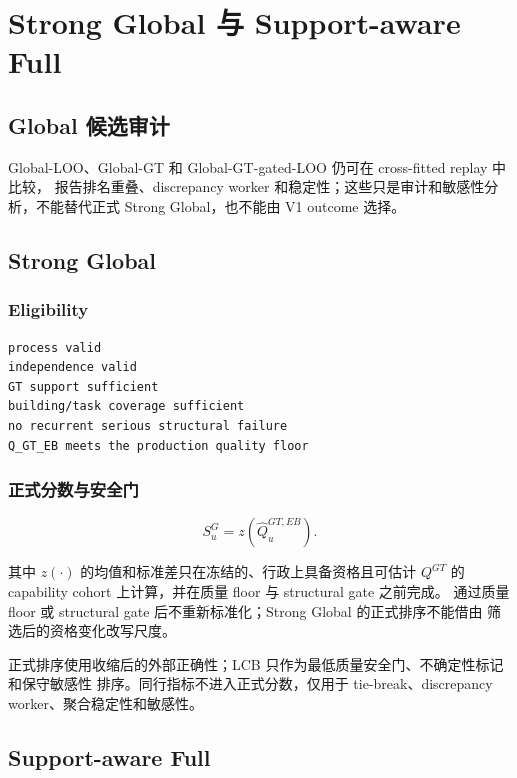 \section{Strong Global 与 Support-aware Full}

\subsection{Global 候选审计}

Global-LOO、Global-GT 和 Global-GT-gated-LOO 仍可在 cross-fitted replay 中比较，
报告排名重叠、discrepancy worker 和稳定性；这些只是审计和敏感性分析，不能替代正式
Strong Global，也不能由 V1 outcome 选择。

\subsection{Strong Global}

\subsubsection{Eligibility}

\begin{verbatim}
process valid
independence valid
GT support sufficient
building/task coverage sufficient
no recurrent serious structural failure
Q_GT_EB meets the production quality floor
\end{verbatim}

\subsubsection{正式分数与安全门}

\[
S^G_u=z\!\left(\widehat Q^{GT,EB}_u\right).
\]

其中 \(z(\cdot)\) 的均值和标准差只在冻结的、行政上具备资格且可估计
\(Q^{GT}\) 的 capability cohort 上计算，并在质量 floor 与 structural gate 之前完成。
通过质量 floor 或 structural gate 后不重新标准化；Strong Global 的正式排序不能借由
筛选后的资格变化改写尺度。

正式排序使用收缩后的外部正确性；LCB 只作为最低质量安全门、不确定性标记和保守敏感性
排序。同行指标不进入正式分数，仅用于 tie-break、discrepancy worker、聚合稳定性和敏感性。

\subsection{Support-aware Full}

